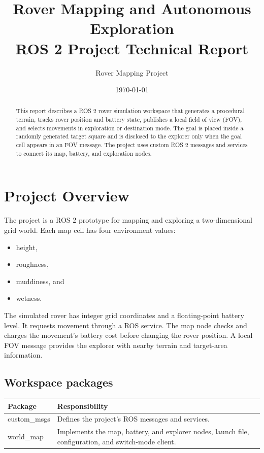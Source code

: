 \documentclass[11pt,a4paper]{article}
\title{
    \vspace{-1.5em}
    \textbf{Rover Mapping and Autonomous Exploration}\\[0.4em]
    \large ROS 2 Project Technical Report
}
\author{Rover Mapping Project}
\date{\today}
\begin{document}
\maketitle
\begin{abstract}
This report describes a ROS 2 rover simulation workspace that generates a
procedural terrain, tracks rover position and battery state, publishes a local
field of view (FOV), and selects movements in exploration or destination mode.
The goal is placed inside a randomly generated target square and is disclosed
to the explorer only when the goal cell appears in an FOV message. The project
uses custom ROS 2 messages and services to connect its map, battery, and
exploration nodes.
\end{abstract}
\newpage

\section{Project Overview}

The project is a ROS 2 prototype for mapping and exploring a two-dimensional
grid world. Each map cell has four environment values:
\begin{itemize}
    \item height,
    \item roughness,
    \item muddiness, and
    \item wetness.
\end{itemize}

The simulated rover has integer grid coordinates and a floating-point battery
level. It requests movement through a ROS service. The map node checks and
charges the movement's battery cost before changing the rover position. A
local FOV message provides the explorer with nearby terrain and target-area
information.

\subsection{Workspace packages}

\begin{tabularx}{\textwidth}{>{\ttfamily}p{}X}
\toprule
\normalfont\textbf{Package} & \textbf{Responsibility}\\
\midrule
custom\_msgs & Defines the project's ROS messages and services.\\
world\_map & Implements the map, battery, and explorer nodes, launch file,
configuration, and switch-mode client.\\
\bottomrule
\end{tabularx}
\end{document}
